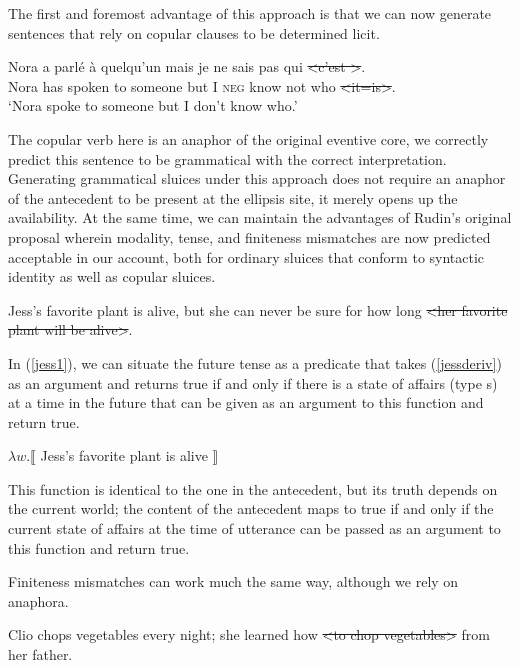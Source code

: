 \documentclass{turabian-researchpaper}
\begin{document}
The first and foremost advantage of this approach is that we can now generate sentences that rely on copular clauses to be determined licit. 

\begin{exe}
\ex\label{noraspoke}
\gll Nora a {parl\'e} \`a quelqu'un mais je ne sais pas qui \sout{\textless c'est \textgreater}.\\
Nora has spoken to someone but I \textsc{neg} know not who \sout{\textless it=is\textgreater}. \\
\trans `Nora spoke to someone but I don't know who.'
\end{exe}

The copular verb here is an anaphor of the original eventive core, we correctly predict this sentence to be grammatical with the correct interpretation. Generating grammatical sluices under this approach does not require an anaphor of the antecedent to be present at the ellipsis site, it merely opens up the availability. At the same time, we can maintain the advantages of Rudin's original proposal wherein modality, tense, and finiteness mismatches are now predicted acceptable in our account, both for ordinary sluices that conform to syntactic identity as well as copular sluices.        

\begin{exe}
 Jess's favorite plant is alive, but she can never be sure for how long \sout{\textless her favorite plant will be alive\textgreater}. 
\end{exe}

In (\ref{jess1}), we can situate the future tense as a predicate that takes (\ref{jessderiv}) as an argument and returns true if and only if there is a state of affairs (type s) at a time in the future that can be given as an argument to this function and return true.

\begin{exe}
\ex\label{jessderiv} $\lambda w.\llbracket$ Jess's favorite plant is alive $\rrbracket$
\end{exe}

This function is identical to the one in the antecedent, but its truth depends on the current world; the content of the antecedent maps to true if and only if the current state of affairs at the time of utterance can be passed as an argument to this function and return true.

Finiteness mismatches can 
work much the same way, although we rely on anaphora. 

\begin{exe}
 Clio chops vegetables every night; she learned how \sout{\textless to chop vegetables\textgreater} from her father.
\end{exe}
\end{document}
